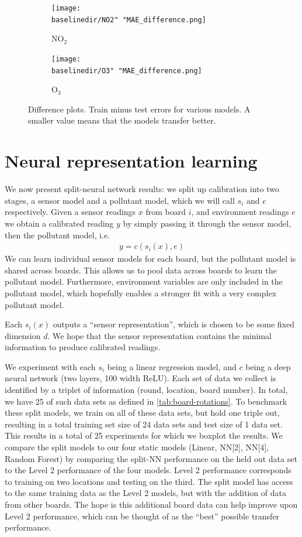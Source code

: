 \documentclass[journal abbreviation, manuscript]{copernicus}
\newcommand{\textus}[1]{$_{\text{#1}}$}
\begin{document}
\begin{figure}[H]
\centering
\begin{subfigure}{0.45\textwidth}
\texttt{[image: \\baselinedir/NO2" "MAE\_difference.png]}
\caption{NO\textus{2}}
\end{subfigure}
\begin{subfigure}{0.45\textwidth}
\texttt{[image: \\baselinedir/O3" "MAE\_difference.png]}
\caption{O\textus{3}}
\end{subfigure}
\caption{Difference plots. Train minus test errors for various models. A smaller value means that the models transfer better.}
\label{fig:generalization}
\end{figure}

\section{Neural representation learning}

We now present split-neural network results: we split
up calibration into two stages, a sensor model
and a pollutant model, which we will call $s_i$ and $c$
respectively.
Given a sensor readings $x$ from board $i$,
and environment readings $e$
we obtain a calibrated reading $y$ by simply passing it through
the sensor model, then the pollutant model, i.e.
\begin{align*}
    y = c(s_i(x), e)
\end{align*}
We can learn individual sensor models for each board,
but the pollutant model is shared across boards. This allows
us to pool data across boards to learn the pollutant model.
Furthermore, environment variables are only 
included in the pollutant model, which hopefully enables
a stronger fit with a very complex pollutant model.

Each $s_i(x)$ outputs a ``sensor representation'', which is chosen
to be some fixed dimension $d$. We hope that the sensor representation
contains the minimal information to produce calibrated readings.

We experiment with each $s_i$ being a linear regression model,
and $c$ being a deep neural network (two layers, 100 width ReLU). 
Each set of data we collect
is identified by a triplet of information (round, location, board number). In total, we have 25 of such data sets as defined in \autoref{tab:board-rotations}. To benchmark these split models, we train on all of these data sets, but
hold one triple out, resulting in a
total training set size of 24 data sets and test size of 1 data set. This results in a total of 25 experiments
for which we boxplot the results.
We compare the split models to our four static models (Linear, NN[2], NN[4], Random Forest) by comparing the split-NN performance on the held out data set to the Level 2 performance of the four models.
Level 2 performance corresponds to training on two locations
and testing on the third. The split model has access to the same training data as the Level 2 models, but with the addition of data from other boards. The hope is this additional board data can help improve upon Level 2 performance, which can be thought of as the ``best'' possible transfer performance.
\end{document}
